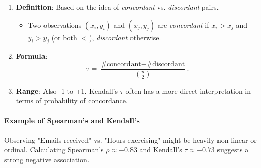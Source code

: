 \documentclass[10pt]{extarticle}
\begin{document}
\begin{enumerate}
    \item \textbf{Definition}: Based on the idea of \emph{concordant} vs. \emph{discordant} pairs.
          \begin{itemize}
              \item Two observations $(x_i, y_i)$ and $(x_j, y_j)$ are \emph{concordant} if $x_i > x_j$ and $y_i > y_j$ (or both $<$), \emph{discordant} otherwise.
          \end{itemize}
    \item \textbf{Formula}:
          \[
              \tau
              = \frac{\text{\#concordant} - \text{\#discordant}}{\binom{n}{2}}.
          \]
    \item \textbf{Range}: Also -1 to +1. Kendall's $\tau$ often has a more direct interpretation in terms of probability of concordance.
\end{enumerate}

\paragraph{Example of Spearman's and Kendall's} Observing "Emails received" vs. "Hours exercising" might be heavily non-linear or ordinal. Calculating Spearman's $\rho \approx -0.83$ and Kendall's $\tau \approx -0.73$ suggests a strong negative association.
\end{document}
